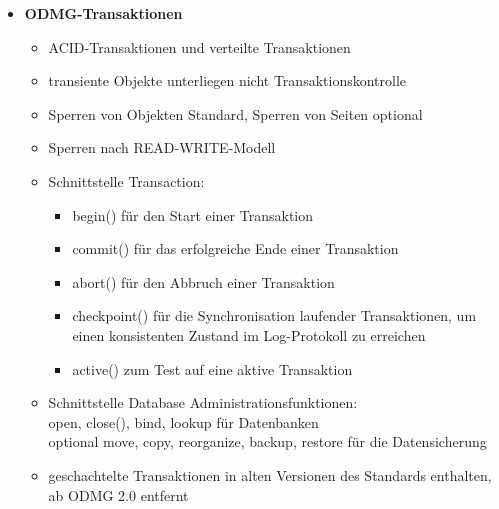 \begin{itemize}
\begin{itemize}
	
		\item \textbf{ODMG-Transaktionen}
		\begin{itemize}
			\item ACID-Transaktionen und verteilte Transaktionen 
			\item transiente Objekte unterliegen nicht Transaktionskontrolle
			\item Sperren von Objekten Standard, Sperren von Seiten optional
			\item Sperren nach READ-WRITE-Modell
			\item Schnittstelle Transaction:
			\begin{itemize}
				\item begin() für den Start einer Transaktion
				\item commit() für das erfolgreiche Ende einer Transaktion
				\item abort() für den Abbruch einer Transaktion
				\item checkpoint() für die Synchronisation laufender Transaktionen, um einen konsistenten Zustand im Log-Protokoll zu erreichen
				\item active() zum Test auf eine aktive Transaktion
			\end{itemize}
			\item Schnittstelle Database Administrationsfunktionen:\\
			open, close(), bind, lookup für Datenbanken\\
			optional move, copy, reorganize, backup, restore für die Datensicherung
			
			\item geschachtelte Transaktionen in alten Versionen des Standards enthalten, ab ODMG 2.0 entfernt
		\end{itemize}
		

\end{itemize}
\end{itemize}
